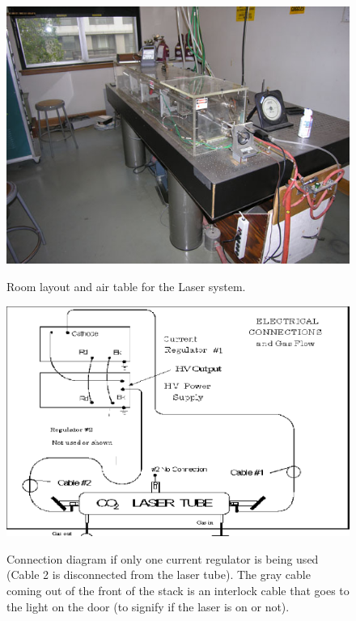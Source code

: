 \documentclass{../lab}
\begin{document}
\begin{figure}[H]
\centering
    \href{http://experimentationlab.berkeley.edu/sites/default/files/images/Co2_3.jpg}{\includegraphics[width=0.7\linewidth]{images/Co2_3.jpg}} \\
    \caption{Room layout and air table for the Laser system.}
\end{figure}

\begin{figure}[H]
\centering
    \href{http://experimentationlab.berkeley.edu/sites/default/files/images/Co2-29-new.png}{\includegraphics[width=0.6\linewidth]{images/Co2-29-new.png}} \\
    \caption{Connection diagram if only one current regulator is being used (Cable 2 is disconnected from the laser tube). The gray cable coming out of the front of the stack is an interlock cable that goes to the light on the door (to signify if the laser is on or not).}
\end{figure}
\end{document}
